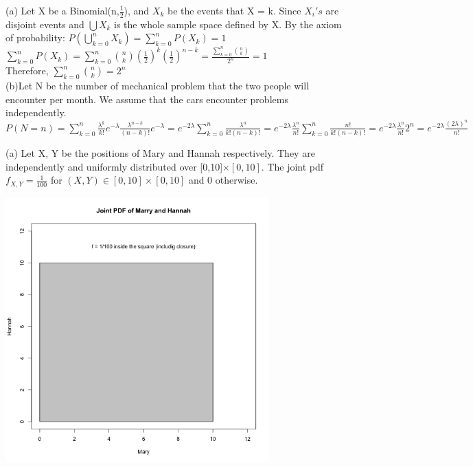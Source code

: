\documentclass[11pt]{article}
\newenvironment{problem}[2][Problem]{\begin{trivlist}
\item[\hskip \labelsep {\bfseries #1}\hskip \labelsep {\bfseries #2.}]}{\end{trivlist}}
\begin{document}
\begin{problem}{3}
	\end{problem}
(a) Let X be a Binomial(n,$\frac{1}{2}$), and $X_k$ be the events that X = k. Since $X_i 's$ are disjoint events and $\bigcup X_k$ is the whole sample space defined by X. By the axiom of probability: $P(\bigcup_{k=0}^n X_k) = \sum_{k =0}^{n}P(X_k) =  1$\\
$\sum_{k =0}^{n}P(X_k) = \sum_{k =0}^{n} {n \choose k}(\frac{1}{2})^k (\frac{1}{2})^{n-k} =\frac{\sum_{k =0}^{n} {n \choose k}}{2^n}  = 1$\\
Therefore, $\sum_{k =0}^{n} {n \choose k} = 2^n$\\

(b)Let N be the number of mechanical problem that the two people will encounter per month. We assume that the cars encounter problems independently.\\
$P(N = n) = \sum_{k =0}^{n} \frac{\lambda^k}{k!}e^{-\lambda} \frac{\lambda^{n-k}}{(n-k)!}e^{-\lambda}  =  e^{-2\lambda} \sum_{k =0}^{n} \frac{\lambda^n}{k!(n-k)!} =e^{-2\lambda} \frac{\lambda^n}{n!}\sum_{k =0}^{n} \frac{n!}{k!(n-k)!}  = e^{-2\lambda} \frac{\lambda^n}{n!} 2^n = e^{-2\lambda} \frac{(2\lambda)^n}{n!}$\\

\begin{problem}{4}
\end{problem}
(a) Let X, Y be the positions of Mary and Hannah respectively. They are independently and  uniformly distributed over [0,10]$\times [0,10]$. The joint pdf $f_{X,Y} = \frac{1}{100}$ for $(X,Y) \in  [0,10] \times [0,10] $ and 0 otherwise.
\begin{center}
	\includegraphics[height = 4in]{Q4_1}
	\end{center}
\end{document}
